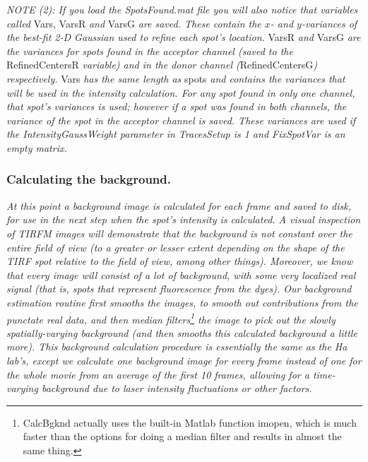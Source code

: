 \documentclass[11pt]{article}
\begin{document}
{\it NOTE (2): If you load the SpotsFound.mat file you will also notice that variables called} Vars, VarsR {\it and} VarsG {\it are saved.  These contain the $x$- and $y$-variances of the best-fit 2-D Gaussian used to refine each spot's location.}  VarsR {\it and} VarsG {\it are the variances for spots found in the acceptor channel (saved to the} RefinedCentersR {\it variable) and in the donor channel (}RefinedCentersG{\it) respectively. } Vars {\it has the same length as} spots {\it and contains the variances that will be used in the intensity calculation.  For any spot found in only one channel, that spot's variances is used; however if a spot was found in both channels, the variance of the spot in the acceptor channel is saved.  These variances are used if the IntensityGaussWeight parameter in TracesSetup is 1 and FixSpotVar is an empty matrix.}

\subsubsection{Calculating the background.}\label{sec:BkgndSub}

{\it At this point a background image is calculated for each frame and saved to disk, for use in the next step when the spot's intensity is calculated.  A visual inspection of TIRFM images will demonstrate that the background is not constant over the entire field of view (to a greater or lesser extent depending on the shape of the TIRF spot relative to the field of view, among other things).  Moreover, we know that every image will consist of a lot of background, with some very localized real signal (that is, spots that represent fluorescence from the dyes).  Our background estimation routine first smooths the images, to smooth out contributions from the punctate real data, and then median filters\footnote{CalcBgknd actually uses the built-in Matlab function imopen, which is much faster than the options for doing a median filter and results in almost the same thing.} the image to pick out the slowly spatially-varying background (and then smooths this calculated background a little more).  This background calculation procedure is essentially the same as the Ha lab's, except we calculate one background image for every frame instead of one for the whole movie from an average of the first 10 frames, allowing for a time-varying background due to laser intensity fluctuations or other factors.}
\end{document}

